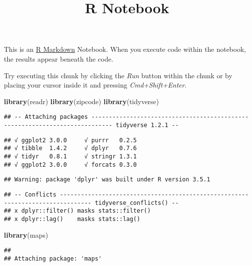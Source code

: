 \documentclass[]{article}
\title{R Notebook}
\author{}
\date{}
\newenvironment{Shaded}{\begin{snugshade}}{\end{snugshade}}
\newcommand{\KeywordTok}[1]{\textcolor[rgb]{0.13,0.29,0.53}{\textbf{#1}}}
\newcommand{\NormalTok}[1]{#1}
\begin{document}
\maketitle

This is an \href{http://rmarkdown.rstudio.com}{R Markdown} Notebook.
When you execute code within the notebook, the results appear beneath
the code.

Try executing this chunk by clicking the \emph{Run} button within the
chunk or by placing your cursor inside it and pressing
\emph{Cmd+Shift+Enter}.

\begin{Shaded}
\begin{Highlighting}[]
\KeywordTok{library}\NormalTok{(readr)}
\KeywordTok{library}\NormalTok{(zipcode)}
\KeywordTok{library}\NormalTok{(tidyverse)}
\end{Highlighting}
\end{Shaded}

\begin{verbatim}
## -- Attaching packages ---------------------------------------------------------------------------- tidyverse 1.2.1 --
\end{verbatim}

\begin{verbatim}
## √ ggplot2 3.0.0     √ purrr   0.2.5
## √ tibble  1.4.2     √ dplyr   0.7.6
## √ tidyr   0.8.1     √ stringr 1.3.1
## √ ggplot2 3.0.0     √ forcats 0.3.0
\end{verbatim}

\begin{verbatim}
## Warning: package 'dplyr' was built under R version 3.5.1
\end{verbatim}

\begin{verbatim}
## -- Conflicts ------------------------------------------------------------------------------- tidyverse_conflicts() --
## x dplyr::filter() masks stats::filter()
## x dplyr::lag()    masks stats::lag()
\end{verbatim}

\begin{Shaded}
\begin{Highlighting}[]
\KeywordTok{library}\NormalTok{(maps)}
\end{Highlighting}
\end{Shaded}

\begin{verbatim}
## 
## Attaching package: 'maps'
\end{verbatim}
\end{document}
